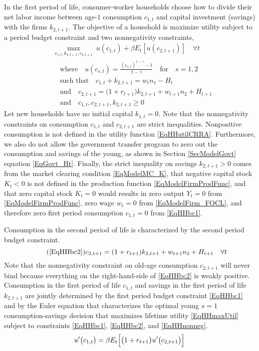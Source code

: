 \documentclass[letterpaper,12pt]{article}
\theoremstyle{definition}
\begin{document}
\begin{spacing}{1.5}
    In the first period of life, consumer-worker households choose how to divide their net labor income between age-$1$ consumption $c_{1,t}$ and capital investment (savings) with the firms $k_{2,t+1}$. The objective of a household is maximize utility subject to a period budget constraint and two nonnegativity constraints,
    \begin{align}
      &\max_{c_{1,t},k_{2,t+1},c_{2,t+1}}\: u(c_{1,t}) + \beta E_t\left[u(c_{2,t+1})\right] \quad \forall t \label{EqHHmaxUtil} \\
      &\quad\text{where}\quad u(c_{s,t}) = \frac{(c_{s,t})^{1-\gamma} - 1}{1-\gamma} \quad\text{for}\quad s=1,2 \label{EqHHutilCRRA} \\
      &\quad\text{such that}\quad c_{1,t} + k_{2,t+1} = w_t n_1 - H_t \label{EqHHbc1} \\
      &\quad\text{and}\quad c_{2,t+1} = \bigl(1+r_{t+1}\bigr)k_{2,t+1} + w_{t+1}n_2 + H_{t+1} \label{EqHHbc2} \\
      &\quad\text{and}\quad c_{1,t},c_{2,t+1},k_{2,t+1} \geq 0 \label{EqHHnonneg}
    \end{align}
    Let new households have no initial capital $k_{1,t} = 0$. Note that the nonnegativity constraints on consumption $c_{1,t}$ and $c_{2,t+1}$ are strict inequalities. Nonpositive consumption is not defined in the utility function \eqref{EqHHutilCRRA}. Furthermore, we also do not allow the government transfer program to zero out the consumption and savings of the young, as shown in Section \ref{SecModelGovt} equation \eqref{EqGovt_Ht}. Finally, the strict inequality on savings $k_{2,t+1}>0$ comes from the market clearing condition \eqref{EqModelMC_K}, that negative capital stock $K_t<0$ is not defined in the production function \eqref{EqModelFirmProdFunc}, and that zero capital stock $K_t=0$ would results in zero output $Y_t=0$ from \eqref{EqModelFirmProdFunc}, zero wage $w_t=0$ from \eqref{EqModelFirm_FOCL}, and therefore zero first period consumption $c_{1,t}=0$ from \eqref{EqHHbc1}.

    Consumption in the second period of life is characterized by the second period budget constraint.
    \begin{equation}\tag{\ref{EqHHbc2}}
       c_{2,t+1} = (1+r_{t+1})k_{2,t+1} + w_{t+1}n_2 + H_{t+1} \quad\forall t
    \end{equation}
    Note that the nonnegativity constraint on old-age consumption $c_{2,t+1}$ will never bind because everything on the right-hand-side of \eqref{EqHHbc2} is weakly positive. Consumption in the first period of life $c_{1,t}$ and savings in the first period of life $k_{2,t+1}$ are jointly determined by the first period budget constraint \eqref{EqHHbc1} and by the Euler equation that characterizes the optimal young $s=1$ consumption-savings decision that maximizes lifetime utility \eqref{EqHHmaxUtil} subject to constraints \eqref{EqHHbc1}, \eqref{EqHHbc2}, and \eqref{EqHHnonneg}.
    \begin{equation}\label{EqHHEul_cs}
       u'\bigl(c_{1,t}\bigr) = \beta E_t\Bigl[\bigl(1+r_{t+1}\bigr)u'\bigl(c_{2,t+1}\bigr)\Bigr]
    \end{equation}


\end{spacing}
\end{document}

